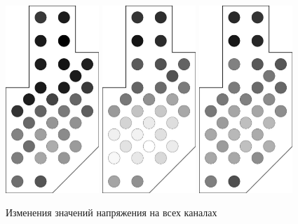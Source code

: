 \documentclass[12pt,twoside]{article}
\begin{document}
\begin{figure}
\begin{center}
	\includegraphics[width=100pt,height=\textheight,keepaspectratio]{wave0.pdf}
	\includegraphics[width=100pt,height=\textheight,keepaspectratio]{wave1.pdf}
	\includegraphics[width=100pt,height=\textheight,keepaspectratio]{wave2.pdf}
	\caption{Изменения значений напряжения на всех каналах}	
	\label{fig:waves}
	\end{center}
\end{figure}
\end{document}
